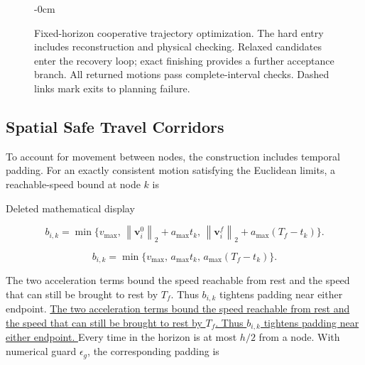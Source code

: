 \documentclass[electronics,article,submit,moreauthors]{Definitions/mdpi}
\newcommand{\norm}[1]{\left\lVert #1\right\rVert}
\newcommand{\bv}{\mathbf{v}}
\providecommand{\DIFadd}[1]{{\protect\color{RevisionBlue}\ifmmode #1\else\uline{#1}\fi}} %
\providecommand{\DIFaddbegin}{}\providecommand{\DIFaddend}{} %
\providecommand{\DIFdelbegin}{}\providecommand{\DIFdelend}{} %
\begin{document}
\begin{figure}[htbp]
\begin{adjustwidth}{-\extralength}{0cm}
\begin{mdframed}[linecolor=RevisionBlue,linewidth=.65pt,innerleftmargin=2pt,innerrightmargin=2pt,innertopmargin=3pt,innerbottommargin=3pt]
{}
\caption{Fixed-horizon cooperative trajectory optimization. The hard entry includes reconstruction and physical checking. Relaxed candidates enter the recovery loop; exact finishing provides a further acceptance branch. All returned motions pass complete-interval checks. Dashed links mark exits to planning failure.\label{fig:framework}}
\end{mdframed}
\end{adjustwidth}
\end{figure}
\DIFaddend 



\subsection{Spatial Safe Travel Corridors}

To account for movement between nodes, the construction includes temporal padding. For an exactly consistent motion satisfying the Euclidean limits, a reachable-speed bound at node $k$ is

\DIFdelbegin 

\begin{mdframed}[nobreak=true,linecolor=RevisionRed,linewidth=.65pt,innerleftmargin=5pt,innerrightmargin=5pt,innertopmargin=2pt,innerbottommargin=2pt,skipabove=6pt,skipbelow=6pt]
\color{RevisionRed}
{\scriptsize Deleted mathematical display}\par
\begin{equation*}
 b_{i,k}=\min\{v_{\max},\,\norm{\bv_i^0}_2+a_{\max}t_k,\,
 \norm{\bv_i^f}_2+a_{\max}(T_f-t_k)\}.
\end{equation*}
\end{mdframed}


\DIFdelend \DIFaddbegin 
\begin{mdframed}[nobreak=true,linecolor=RevisionBlue,linewidth=.65pt,innerleftmargin=5pt,innerrightmargin=5pt,innertopmargin=2pt,innerbottommargin=2pt,skipabove=6pt,skipbelow=6pt]
\color{RevisionBlue}
\begin{equation}
 b_{i,k}=\min\{v_{\max},\,a_{\max}t_k,\,a_{\max}(T_f-t_k)\}.
 \label{eq:rate}
\end{equation}
\end{mdframed}

\DIFaddend 

\DIFaddbegin \DIFadd{The two acceleration terms bound the speed reachable from rest and the speed that can still be brought to rest by $T_f$. Thus $b_{i,k}$ tightens padding near either endpoint. }\DIFaddend Every time in the horizon is at most $h/2$ from a node. With numerical guard $\epsilon_g$, the corresponding padding is
\end{document}
